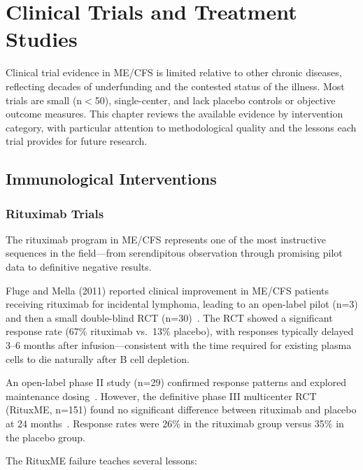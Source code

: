 \chapter{Clinical Trials and Treatment Studies}
\label{ch:clinical-trials}

Clinical trial evidence in ME/CFS is limited relative to other chronic diseases, reflecting decades of underfunding and the contested status of the illness. Most trials are small (n$<$50), single-center, and lack placebo controls or objective outcome measures. This chapter reviews the available evidence by intervention category, with particular attention to methodological quality and the lessons each trial provides for future research.

\section{Immunological Interventions}
\label{sec:trials-immunological}

\subsection{Rituximab Trials}

The rituximab program in ME/CFS represents one of the most instructive sequences in the field---from serendipitous observation through promising pilot data to definitive negative results.

Fluge and Mella (2011) reported clinical improvement in ME/CFS patients receiving rituximab for incidental lymphoma, leading to an open-label pilot (n=3) and then a small double-blind RCT (n=30)~\cite{Fluge2011rituximab}. The RCT showed a significant response rate (67\% rituximab vs.\ 13\% placebo), with responses typically delayed 3--6 months after infusion---consistent with the time required for existing plasma cells to die naturally after B cell depletion.

An open-label phase II study (n=29) confirmed response patterns and explored maintenance dosing~\cite{Fluge2015rituximab_rct}. However, the definitive phase III multicenter RCT (RituxME, n=151) found no significant difference between rituximab and placebo at 24 months~\cite{Fluge2019}. Response rates were 26\% in the rituximab group versus 35\% in the placebo group.

The RituxME failure teaches several lessons:

